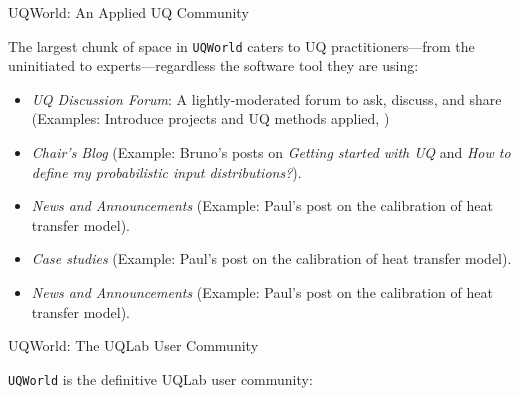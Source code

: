\documentclass[]{rsuqbeamernew}
\begin{document}
\begin{frame}[t]{UQWorld: An Applied UQ Community}
  
The largest chunk of space in \texttt{UQWorld} caters to UQ practitioners---from the uninitiated to experts---regardless the software tool they are using:

\begin{itemize}
  \item \emph{UQ Discussion Forum}: A lightly-moderated forum to ask, discuss, and share (Examples: Introduce projects and UQ methods applied, )
  \item \emph{Chair's Blog} (Example: Bruno's posts on \emph{Getting started with UQ} and \emph{How to define my probabilistic input distributions?}).
  \item \emph{News and Announcements} (Example: Paul's post on the calibration of heat transfer model).
  \item \emph{Case studies} (Example: Paul's post on the calibration of heat transfer model).
  \item \emph{News and Announcements} (Example: Paul's post on the calibration of heat transfer model).
\end{itemize}

\end{frame}

\begin{frame}[t]{UQWorld: The UQLab User Community}
  
\texttt{UQWorld} is the definitive UQLab user community:

\end{frame}
\end{document}

